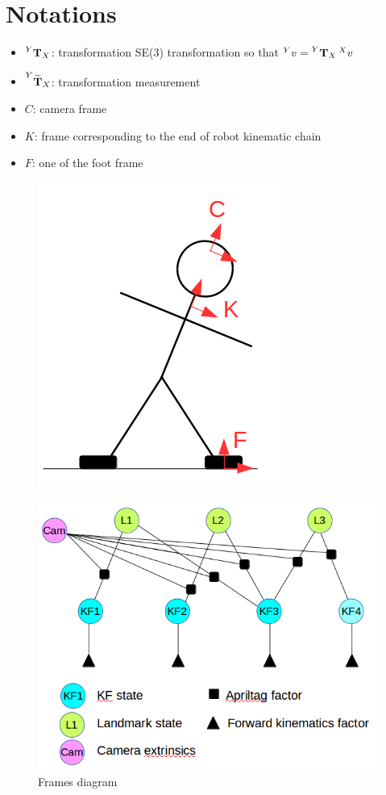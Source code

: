 \documentclass[11pt]{article}
\newcommand{\T}[2]{\prescript{#1}{}{\bfT}_{#2}}
\newcommand{\Tm}[2]{\prescript{#1}{}{\widetilde{\bfT}}_{#2}}
\begin{document}
\section{Notations}
\begin{itemize}
    \item $\T{Y}{X}$: transformation SE(3) transformation so that $\prescript{Y}{}{v}=\T{Y}{X}\prescript{X}{}{v}$
    \item $\Tm{Y}{X}$: transformation measurement
    \item $C$: camera frame
    \item $K$: frame corresponding to the end of robot kinematic chain 
    \item $F$: one of the foot frame 
\end{itemize}

\begin{figure}[ht]
\begin{minipage}[c]{.46\linewidth}
    \centering
    \includegraphics[width=0.6\linewidth]{robot_sketch.png}
    \label{fig:sketch}
    \caption{Frames diagram}
\end{minipage} \hfill
\begin{minipage}[c]{.46\linewidth}
    \centering
    \includegraphics[width=\linewidth]{cam_extrinsics_factor_graph.png}

\end{minipage}
\end{figure}
\end{document}
